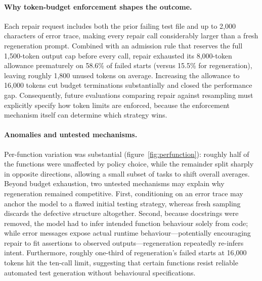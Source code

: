\documentclass[11pt,a4paper]{article}
\begin{document}
\paragraph{Why token-budget enforcement shapes the outcome.}
Each repair request includes both the prior failing test file and up to 2{,}000 characters of error trace, making every repair call considerably larger than a fresh regeneration prompt. Combined with an admission rule that reserves the full 1{,}500-token output cap before every call, repair exhausted its 8{,}000-token allowance prematurely on 58.6\% of failed starts (versus 15.5\% for regeneration), leaving roughly 1{,}800 unused tokens on average. Increasing the allowance to 16{,}000 tokens cut budget terminations substantially and closed the performance gap. Consequently, future evaluations comparing repair against resampling must explicitly specify how token limits are enforced, because the enforcement mechanism itself can determine which strategy wins.

\paragraph{Anomalies and untested mechanisms.}
Per-function variation was substantial (figure~\ref{fig:perfunction}): roughly half of the functions were unaffected by policy choice, while the remainder split sharply in opposite directions, allowing a small subset of tasks to shift overall averages. Beyond budget exhaustion, two untested mechanisms may explain why regeneration remained competitive. First, conditioning on an error trace may anchor the model to a flawed initial testing strategy, whereas fresh sampling discards the defective structure altogether. Second, because docstrings were removed, the model had to infer intended function behaviour solely from code; while error messages expose actual runtime behaviour---potentially encouraging repair to fit assertions to observed outputs---regeneration repeatedly re-infers intent. Furthermore, roughly one-third of regeneration's failed starts at 16{,}000 tokens hit the ten-call limit, suggesting that certain functions resist reliable automated test generation without behavioural specifications.
\end{document}
